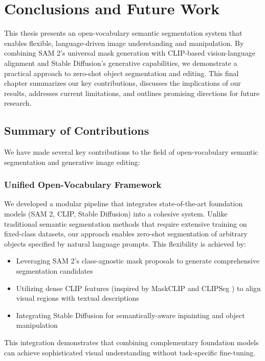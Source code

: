 \chapter{Conclusions and Future Work}

This thesis presents an open-vocabulary semantic segmentation system that enables flexible, language-driven image understanding and manipulation. By combining SAM 2's universal mask generation with CLIP-based vision-language alignment and Stable Diffusion's generative capabilities, we demonstrate a practical approach to zero-shot object segmentation and editing. This final chapter summarizes our key contributions, discusses the implications of our results, addresses current limitations, and outlines promising directions for future research.

\section{Summary of Contributions}

We have made several key contributions to the field of open-vocabulary semantic segmentation and generative image editing:

\subsection{Unified Open-Vocabulary Framework}

We developed a modular pipeline that integrates state-of-the-art foundation models (SAM 2, CLIP, Stable Diffusion) into a cohesive system. Unlike traditional semantic segmentation methods that require extensive training on fixed-class datasets, our approach enables zero-shot segmentation of arbitrary objects specified by natural language prompts. This flexibility is achieved by:

\begin{itemize}
    \item Leveraging SAM 2's class-agnostic mask proposals to generate comprehensive segmentation candidates
    \item Utilizing dense CLIP features (inspired by MaskCLIP \cite{zhou2022extract} and CLIPSeg \cite{luddecke2022clipseg}) to align visual regions with textual descriptions
    \item Integrating Stable Diffusion for semantically-aware inpainting and object manipulation
\end{itemize}

This integration demonstrates that combining complementary foundation models can achieve sophisticated visual understanding without task-specific fine-tuning.

